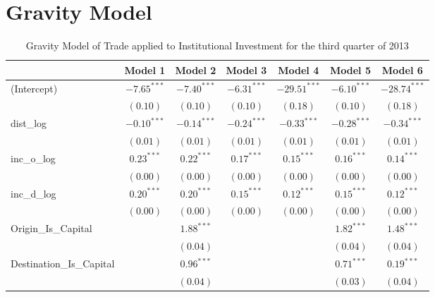 \chapter{Gravity Model}

\label{GravityModelappendix}

\begin{table}
	\small
	\begin{center}
			\caption[Gravity Model of trade for Q3 2013]{Gravity Model of Trade applied to Institutional Investment for the third quarter of 2013}
		
		\begin{tabular}{l c c c c c c }
		\hline
		& Model 1 & Model 2 & Model 3 & Model 4 & Model 5 & Model 6 \\
		\hline
		(Intercept)                  & $-7.65^{***}$ & $-7.40^{***}$ & $-6.31^{***}$ & $-29.51^{***}$ & $-6.10^{***}$ & $-28.74^{***}$ \\
		& $(0.10)$      & $(0.10)$      & $(0.10)$      & $(0.18)$       & $(0.10)$      & $(0.18)$       \\
		dist\_log                    & $-0.10^{***}$ & $-0.14^{***}$ & $-0.24^{***}$ & $-0.33^{***}$  & $-0.28^{***}$ & $-0.34^{***}$  \\
		& $(0.01)$      & $(0.01)$      & $(0.01)$      & $(0.01)$       & $(0.01)$      & $(0.01)$       \\
		inc\_o\_log                  & $0.23^{***}$  & $0.22^{***}$  & $0.17^{***}$  & $0.15^{***}$   & $0.16^{***}$  & $0.14^{***}$   \\
		& $(0.00)$      & $(0.00)$      & $(0.00)$      & $(0.00)$       & $(0.00)$      & $(0.00)$       \\
		inc\_d\_log                  & $0.20^{***}$  & $0.20^{***}$  & $0.15^{***}$  & $0.12^{***}$   & $0.15^{***}$  & $0.12^{***}$   \\
		& $(0.00)$      & $(0.00)$      & $(0.00)$      & $(0.00)$       & $(0.00)$      & $(0.00)$       \\
		Origin\_Is\_Capital          &               & $1.88^{***}$  &               &                & $1.82^{***}$  & $1.48^{***}$   \\
		&               & $(0.04)$      &               &                & $(0.04)$      & $(0.04)$       \\
		Destination\_Is\_Capital     &               & $0.96^{***}$  &               &                & $0.71^{***}$  & $0.19^{***}$   \\
		&               & $(0.04)$      &               &                & $(0.03)$      & $(0.04)$       \\

\end{tabular}
\end{center}
\end{table}
